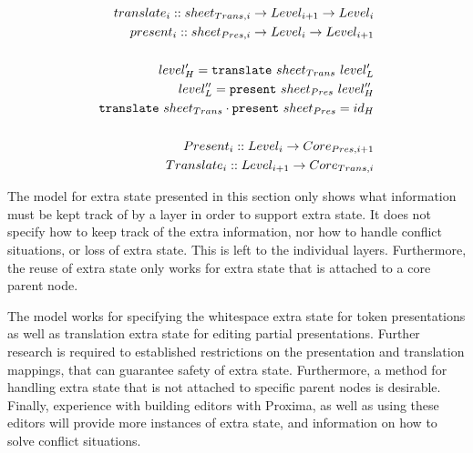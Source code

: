 \begin{small}\begin{align*}%
translate_{i} :: sheet_{Trans,i} \rightarrow Level_{i+1} \rightarrow Level_{i}\\
present_{i} :: sheet_{Pres,i}  \rightarrow  Level_{i} \rightarrow Level_{i+1}\\
\\
level'_{H} = {\tt translate}~sheet_{Trans}~level'_{L}\\
level''_{L} = {\tt present}~sheet_{Pres}~level''_{H}\\
{\tt translate}~sheet_{Trans}  \cdot {\tt present}~sheet_{Pres} = id_{H}\\
\\
Present_{i} :: Level_{i} \rightarrow Core_{Pres,i+1}\\
Translate_{i} :: Level_{i+1} \rightarrow Core_{Trans,i}\\
\end{align*} 
\end{small}
\center{()}
\ec


The model for extra state presented in this section only shows what information must be kept track of by a layer in order to support extra state. It does not specify how to keep track of the extra information, nor how to handle conflict situations, or loss of extra state. This is left to the individual layers. Furthermore, the reuse of extra state only works for extra state that is attached to a core parent node. 

The model works for specifying the whitespace extra state for token presentations as well as translation extra state for editing partial presentations. Further research is required to established restrictions on the presentation and translation mappings, that can guarantee safety of extra state. Furthermore, a method for handling extra state that is not attached to specific parent nodes is desirable.  Finally, experience with building editors with Proxima, as well as using these editors will provide more instances of extra state, and information on how to solve conflict situations.


